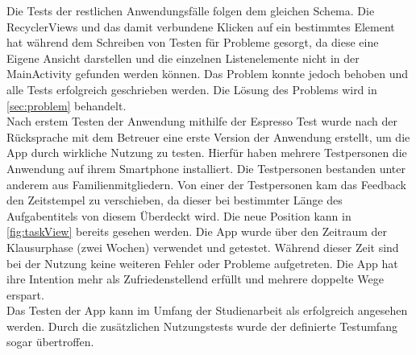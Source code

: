Die Tests der restlichen Anwendungsfälle folgen dem gleichen Schema. Die RecyclerViews und das damit verbundene Klicken auf ein bestimmtes Element hat während dem Schreiben von Testen für Probleme gesorgt, da diese eine Eigene Ansicht darstellen und die einzelnen Listenelemente nicht in der MainActivity gefunden werden können. Das Problem konnte jedoch behoben und alle Tests erfolgreich geschrieben werden. Die Lösung des Problems wird in \autoref{sec:problem} behandelt.\\
Nach erstem Testen der Anwendung mithilfe der Espresso Test wurde nach der Rücksprache mit dem Betreuer eine erste Version der Anwendung erstellt, um die App durch wirkliche Nutzung zu testen. Hierfür haben mehrere Testpersonen die Anwendung auf ihrem Smartphone installiert. Die Testpersonen bestanden unter anderem aus Familienmitgliedern. Von einer der Testpersonen kam das Feedback den Zeitstempel zu verschieben, da dieser bei bestimmter Länge des Aufgabentitels von diesem Überdeckt wird. Die neue Position kann in \autoref{fig:taskView} bereits gesehen werden. Die App wurde über den Zeitraum der Klausurphase (zwei Wochen) verwendet und getestet. Während dieser Zeit sind bei der Nutzung keine weiteren Fehler oder Probleme aufgetreten. Die App hat ihre Intention mehr als Zufriedenstellend erfüllt und mehrere doppelte Wege erspart.\\
Das Testen der App kann im Umfang der Studienarbeit als erfolgreich angesehen werden. Durch die zusätzlichen Nutzungstests wurde der definierte Testumfang sogar übertroffen.

